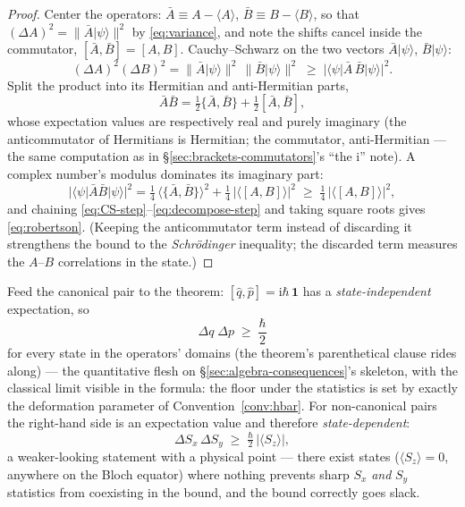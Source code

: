 \documentclass[11pt]{article}
\theoremstyle{plain}
\theoremstyle{definition}
\theoremstyle{remark}
\newcommand{\ii}{\mathrm{i}}
\newcommand{\op}[1]{\hat{#1}}
\newcommand{\idop}{\mathbf{1}}  %
\newcommand{\ket}[1]{\lvert #1 \rangle}
\newcommand{\bra}[1]{\langle #1 \rvert}
\begin{document}
\begin{proof}
Center the operators: $\bar A \equiv A - \langle A\rangle$,
$\bar B \equiv B - \langle B\rangle$, so that
$(\Delta A)^2 = \|\bar A\ket\psi\|^2$ by \eqref{eq:variance}, and
note the shifts cancel inside the commutator,
$[\bar A, \bar B] = [A, B]$. Cauchy--Schwarz on the two vectors
$\bar A\ket\psi$, $\bar B\ket\psi$:
\begin{equation}
  (\Delta A)^2 (\Delta B)^2
  = \|\bar A\ket\psi\|^2\,\|\bar B\ket\psi\|^2
  \;\ge\;
  \bigl|\bra\psi \bar A\,\bar B\ket\psi\bigr|^2 .
  \label{eq:CS-step}
\end{equation}
Split the product into its Hermitian and anti-Hermitian parts,
\begin{equation}
  \bar A \bar B
  = \tfrac12\{\bar A, \bar B\}
  + \tfrac12[\bar A, \bar B],
\end{equation}
whose expectation values are respectively real and purely imaginary
(the anticommutator of Hermitians is Hermitian; the commutator,
anti-Hermitian --- the same computation as in
\S\ref{sec:brackets-commutators}'s ``the $\ii$'' note). A complex
number's modulus dominates its imaginary part:
\begin{equation}
  \bigl|\bra\psi\bar A\bar B\ket\psi\bigr|^2
  = \tfrac14\,\bigl\langle\{\bar A, \bar B\}\bigr\rangle^2
  + \tfrac14\,\bigl|\bigl\langle[A, B]\bigr\rangle\bigr|^2
  \;\ge\;
  \tfrac14\,\bigl|\bigl\langle[A, B]\bigr\rangle\bigr|^2 ,
  \label{eq:decompose-step}
\end{equation}
and chaining \eqref{eq:CS-step}--\eqref{eq:decompose-step} and
taking square roots gives \eqref{eq:robertson}. (Keeping the
anticommutator term instead of discarding it strengthens the bound
to the \emph{Schr\"odinger} inequality; the discarded term measures
the $A$--$B$ correlations in the state.)
\end{proof}

\noindent
Feed the canonical pair to the theorem: $[\op q, \op p] =
\ii\hbar\,\idop$ has a \emph{state-independent} expectation, so
\begin{equation}
  \boxed{\;
  \Delta q\;\Delta p \;\ge\; \frac{\hbar}{2}
  \;}
  \label{eq:heisenberg}
\end{equation}
for every state in the operators' domains (the theorem's
parenthetical clause rides along) --- the quantitative flesh on
\S\ref{sec:algebra-consequences}'s skeleton, with the classical
limit visible in the formula: the floor under the statistics is set
by exactly the deformation parameter of
Convention~\ref{conv:hbar}. For non-canonical pairs the right-hand
side is an expectation value and therefore \emph{state-dependent}:
\begin{equation}
  \Delta S_x\,\Delta S_y \;\ge\; \tfrac\hbar2\,
  \bigl|\langle S_z\rangle\bigr| ,
  \label{eq:spin-uncertainty}
\end{equation}
a weaker-looking statement with a physical point --- there exist
states ($\langle S_z\rangle = 0$, anywhere on the Bloch equator)
where nothing prevents sharp $S_x$ \emph{and} $S_y$ statistics from
coexisting in the bound, and the bound correctly goes slack.
\end{document}
